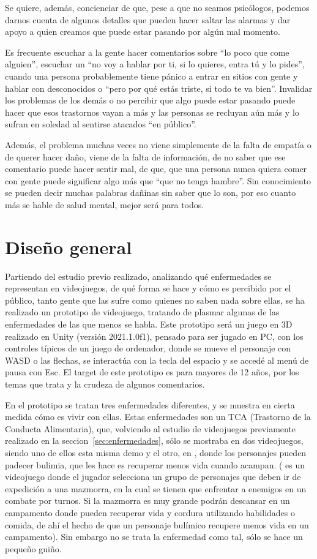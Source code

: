 \documentclass[12pt, a4paper,twoside,titlepage]{book}
\begin{document}
Se quiere, además, concienciar de que, pese a que no seamos psicólogos, podemos darnos cuenta de algunos detalles que pueden hacer saltar las alarmas y dar apoyo a quien creamos que puede estar pasando por algún mal momento. 

Es frecuente escuchar a la gente hacer comentarios sobre ``lo poco que come alguien'', escuchar un ``no voy a hablar por ti, si lo quieres, entra tú y lo pides'', cuando una persona probablemente tiene pánico a entrar en sitios con gente y hablar con desconocidos o ``pero por qué estás triste, si todo te va bien''. Invalidar los problemas de los demás o no percibir que algo puede estar pasando puede hacer que esos trastornos vayan a más y las personas se recluyan aún más y lo sufran en soledad al sentirse atacados ``en público''. 

Además, el problema muchas veces no viene simplemente de la falta de empatía o de querer hacer daño, viene de la falta de información, de no saber que ese comentario puede hacer sentir mal, de que, que una persona nunca quiera comer con gente puede significar algo más que ``que no tenga hambre''. Sin conocimiento se pueden decir muchas palabras dañinas sin saber que lo son, por eso cuanto más se hable de salud mental, mejor será para todos. 

\label{sec:diseño}
\section{Diseño general}
Partiendo del estudio previo realizado, analizando qué enfermedades se representan en videojuegos, de qué forma se hace y cómo es percibido por el público, tanto gente que las sufre como quienes no saben nada sobre ellas, se ha realizado un prototipo de videojuego, tratando de plasmar algunas de las enfermedades de las que menos se habla. Este prototipo será un juego en 3D realizado en Unity (versión 2021.1.0f1), pensado para ser jugado en PC, con los controles típicos de un juego de ordenador, donde se mueve el personaje con WASD o las flechas, se interactúa con la tecla del espacio y se accedé al menú de pausa con Esc. El target de este prototipo es para mayores de 12 años, por los temas que trata y la crudeza de algunos comentarios.  

En el prototipo se tratan tres enfermedades diferentes, y se muestra en cierta medida cómo es vivir con ellas. Estas enfermedades son un TCA (Trastorno de la Conducta Alimentaria), que, volviendo al estudio de videojuegos previamente realizado en la seccion~\ref{sec:enfermedades}, sólo se mostraba en dos videojuegos, siendo uno de ellos esta misma demo y el otro, en , donde los personajes pueden padecer bulimia, que les hace es recuperar menos vida cuando acampan. ( es un videojuego donde el jugador selecciona un grupo de personajes que deben ir de expedición a una mazmorra, en la cual se tienen que enfrentar a enemigos en un combate por turnos. Si la mazmorra es muy grande podrán descansar en un campamento donde pueden recuperar vida y cordura utilizando habilidades o comida, de ahí el hecho de que un personaje bulímico recupere menos vida en un campamento). Sin embargo no se trata la enfermedad como tal, sólo se hace un pequeño guiño. 
\end{document}
